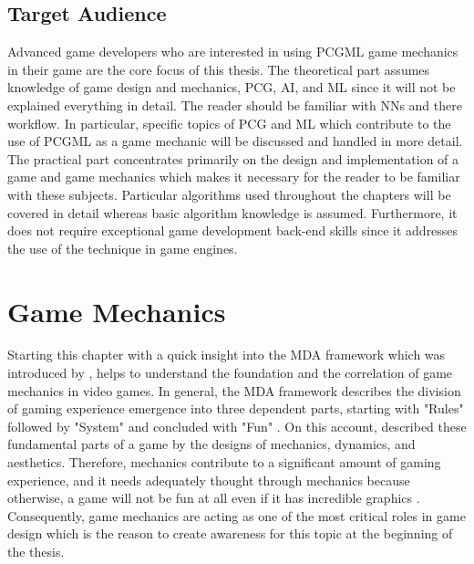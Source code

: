 \documentclass[MGS,Master,english]{twbook}%
\begin{document}
\section{Target Audience}
Advanced game developers who are interested in using PCGML game mechanics in their game are the core focus of this thesis. The theoretical part assumes knowledge of game design and mechanics, PCG, \ac{AI}, and ML since it will not be explained everything in detail. {\color{blue}The reader should be familiar with \acp{NN} and there workflow. } In particular, specific topics of PCG and ML which contribute to the use of PCGML as a game mechanic will be discussed and handled in more detail.\\
The practical part concentrates primarily on the design and implementation of a game and game mechanics which makes it necessary for the reader to be familiar with these subjects. Particular algorithms used throughout the chapters will be covered in detail whereas basic algorithm knowledge is assumed. Furthermore, it does not require exceptional game development back-end skills since it addresses the use of the technique in game engines.

%
%
\clearpage
\chapter{Game Mechanics} \label{gameMechanicsChapter}
Starting this chapter with a quick insight into the \ac{MDA} framework which was introduced by \citep{mechanic::MDA}, helps to understand the foundation and the correlation of game mechanics in video games. In general, the MDA framework describes the division of gaming experience emergence into three dependent parts, starting with "Rules" followed by "System" and concluded with "Fun" \cite{mechanic::MDA}.  On this account, \citep{mechanic::MDA} described these fundamental parts of a game by the designs of mechanics, dynamics, and aesthetics. Therefore, mechanics contribute to a significant amount of gaming experience, and it needs adequately thought through mechanics because otherwise, a game will not be fun at all even if it has incredible graphics \cite{gameDesign::gameMechanicsAdvancedGameDesign}. Consequently, game mechanics are acting as one of the most critical roles in game design which is the reason to create awareness for this topic at the beginning of the thesis.
\end{document}
